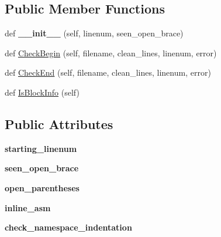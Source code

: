 \subsection*{Public Member Functions}
\begin{DoxyCompactItemize}
\item 
def {\bfseries \+\_\+\+\_\+init\+\_\+\+\_\+} (self, linenum, seen\+\_\+open\+\_\+brace)\hypertarget{classcpplint_1_1__BlockInfo_ab1663260e978a348a4ff2ab9d7324587}{}\label{classcpplint_1_1__BlockInfo_ab1663260e978a348a4ff2ab9d7324587}

\item 
def \hyperlink{classcpplint_1_1__BlockInfo_af316a9e3623b45bd07079166be67582c}{Check\+Begin} (self, filename, clean\+\_\+lines, linenum, error)
\item 
def \hyperlink{classcpplint_1_1__BlockInfo_ae504a3429de136eebf85f32fcae6a8ca}{Check\+End} (self, filename, clean\+\_\+lines, linenum, error)
\item 
def \hyperlink{classcpplint_1_1__BlockInfo_ab3e06a94a38d7397ce6a4faa094010d4}{Is\+Block\+Info} (self)
\end{DoxyCompactItemize}
\subsection*{Public Attributes}
\begin{DoxyCompactItemize}
\item 
{\bfseries starting\+\_\+linenum}\hypertarget{classcpplint_1_1__BlockInfo_a81d316f03e42aebbfe0636f905c4c291}{}\label{classcpplint_1_1__BlockInfo_a81d316f03e42aebbfe0636f905c4c291}

\item 
{\bfseries seen\+\_\+open\+\_\+brace}\hypertarget{classcpplint_1_1__BlockInfo_aa974539217437751383ad20896c974d7}{}\label{classcpplint_1_1__BlockInfo_aa974539217437751383ad20896c974d7}

\item 
{\bfseries open\+\_\+parentheses}\hypertarget{classcpplint_1_1__BlockInfo_a02a0b48995a599f6b2bbaa6f16cca98a}{}\label{classcpplint_1_1__BlockInfo_a02a0b48995a599f6b2bbaa6f16cca98a}

\item 
{\bfseries inline\+\_\+asm}\hypertarget{classcpplint_1_1__BlockInfo_aad762ef7088f2f556a75c9a80006f4db}{}\label{classcpplint_1_1__BlockInfo_aad762ef7088f2f556a75c9a80006f4db}

\item 
{\bfseries check\+\_\+namespace\+\_\+indentation}\hypertarget{classcpplint_1_1__BlockInfo_a120822b07db37b3480a573ec29ee4457}{}\label{classcpplint_1_1__BlockInfo_a120822b07db37b3480a573ec29ee4457}

\end{DoxyCompactItemize}


